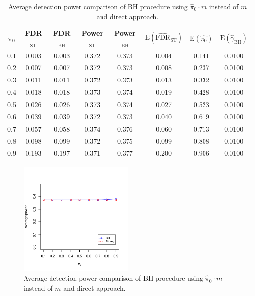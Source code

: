 \documentclass[10pt]{article}
\begin{document}
\begin{table}[H]
	\centering	
	\begin{tabular}{cccccccc}
		$\pi_{0}$ & FDR$_{\text{ST}}$ & FDR$_{\text{BH}}$ & Power$_{\text{ST}}$ & Power$_{\text{BH}}$ & $\text{E} (\widehat{\text{FDR}}_{\text{ST}} )$ & $\text{E}(\widehat{\pi_{0}})$ & $\text{E}(\widehat{\gamma}_{\text{BH}})$ \\ 
		\hline
		0.1 & 0.003 & 0.003 & 0.372 & 0.373 & 0.004 & 0.141 & 0.0100 \\ 
		0.2 & 0.007 & 0.007 & 0.372 & 0.373 & 0.008 & 0.237 & 0.0100 \\ 
		0.3 & 0.011 & 0.011 & 0.372 & 0.373 & 0.013 & 0.332 & 0.0100 \\ 
		0.4 & 0.018 & 0.018 & 0.373 & 0.374 & 0.019 & 0.428 & 0.0100 \\ 
		0.5 & 0.026 & 0.026 & 0.373 & 0.374 & 0.027 & 0.523 & 0.0100 \\ 
		0.6 & 0.039 & 0.039 & 0.372 & 0.373 & 0.040 & 0.619 & 0.0100 \\ 
		0.7 & 0.057 & 0.058 & 0.374 & 0.376 & 0.060 & 0.713 & 0.0100 \\ 
		0.8 & 0.098 & 0.099 & 0.372 & 0.375 & 0.099 & 0.808 & 0.0100 \\ 
		0.9 & 0.193 & 0.197 & 0.371 & 0.377 & 0.200 & 0.906 & 0.0100 \\ 
		\hline
	\end{tabular}
	\caption{Average detection power comparison of BH procedure using $\widehat{\pi}_{0} \cdot m$ instead of $m$ and direct approach.}
	\label{tab: power_pi0_BH}	
\end{table}


\begin{figure}[H]
	\centering
	\includegraphics[width=0.5\textwidth]{power_pi0_BH.pdf}
	\caption{Average detection power comparison of BH procedure using $\widehat{\pi}_{0} \cdot m$ instead of $m$ and direct approach.}
	\label{fig: power_pi0_BH}	
\end{figure}
\end{document}
